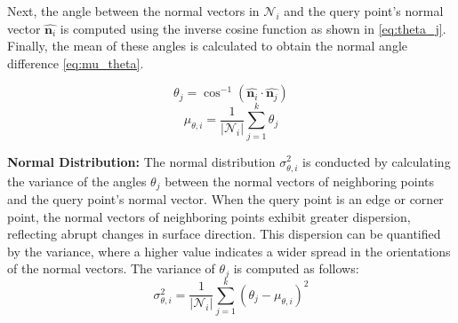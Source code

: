 \documentclass[lettersize,journal]{IEEEtran}
\begin{document}
Next, the angle between the normal vectors in \( \mathcal{N}_i \) and the query point's normal vector \( \hat{\mathbf{n}_i} \) is computed using the inverse cosine function as shown in \cref{eq:theta_j}. Finally, the mean of these angles is calculated to obtain the normal angle difference \cref{eq:mu_theta}.

\begin{equation}
    \theta_j = \cos^{-1}(\hat{\mathbf{n}_i} \cdot \hat{\mathbf{n}_j})
    \label{eq:theta_j}
\end{equation}
\begin{equation}
    \mu_{\theta,i} = \frac{1}{|\mathcal{N}_i|} \sum_{j = 1}^k \theta_j
    \label{eq:mu_theta}
\end{equation}



\textbf{Normal Distribution:} The normal distribution $\sigma^2_{\theta,i}$ is conducted by calculating the variance of the angles $\theta_j$ between the normal vectors of neighboring points and the query point's normal vector. When the query point is an edge or corner point, the normal vectors of neighboring points exhibit greater dispersion, reflecting abrupt changes in surface direction. This dispersion can be quantified by the variance, where a higher value indicates a wider spread in the orientations of the normal vectors. The variance of $\theta_j$ is computed as follows:
\begin{equation}
    \sigma^2_{\theta,i} = \frac{1}{|\mathcal{N}_i|} \sum_{j = 1}^k (\theta_j - \mu_{\theta,i})^2
    \label{eq:sigma_theta}
\end{equation}
\end{document}
